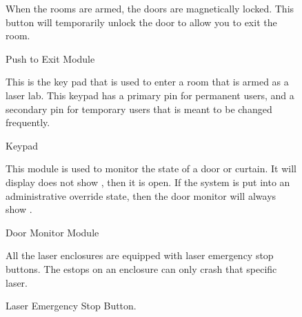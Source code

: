 \documentclass[letterpaper,10pt,english]{sphinxmanual}
\begin{document}
\begin{figure}[htbp]
\centering
\capstart

\noindent{}
\caption{ Push to Exit Module}\label{\detokenize{user_documentation/Laser-1:id5}}
\begin{sphinxlegend}
\sphinxAtStartPar
When the rooms are armed, the doors are magnetically locked.
This button will temporarily unlock the door to allow you to exit the room.
\end{sphinxlegend}
\end{figure}

\begin{figure}[htbp]
\centering
\capstart

\noindent{}
\caption{ Keypad}\label{\detokenize{user_documentation/Laser-1:id6}}
\begin{sphinxlegend}
\sphinxAtStartPar
This is the key pad that is used to enter a room that is armed as a laser lab.
This keypad has a primary pin for permanent users, and a secondary pin for temporary users that is meant to be changed frequently.
\end{sphinxlegend}
\end{figure}

\begin{figure}[htbp]
\centering
\capstart

\noindent{}
\caption{ Door Monitor Module}\label{\detokenize{user_documentation/Laser-1:id7}}
\begin{sphinxlegend}
\sphinxAtStartPar
This module is used to monitor the state of a door or curtain.
It will display does not show , then it is open.
If the system is put into an administrative override state, then the door monitor will always show .
\end{sphinxlegend}
\end{figure}

\begin{figure}[htbp]
\centering
\capstart

\noindent{}
\caption{ Laser Emergency Stop Button.}\label{\detokenize{user_documentation/Laser-1:id8}}
\begin{sphinxlegend}
\sphinxAtStartPar
All the laser enclosures are equipped with laser emergency stop buttons.
The e\sphinxhyphen{}stops on an enclosure can only crash that specific laser.
\end{sphinxlegend}
\end{figure}
\end{document}
